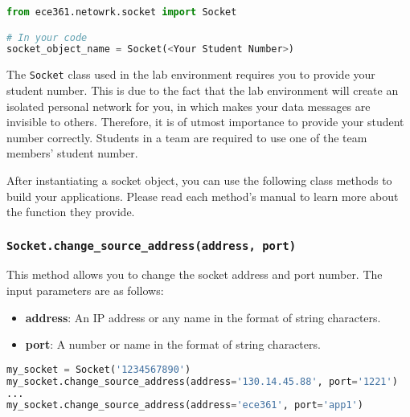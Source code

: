 \documentclass[11pt]{article}
\begin{document}
\begin{lstlisting}[caption={Importing the \texttt{Socket} class}, language=Python]
from ece361.netowrk.socket import Socket

# In your code
socket_object_name = Socket(<Your Student Number>)
\end{lstlisting}

The \texttt{Socket} class used in the lab environment requires you to provide your student number. This is due to the fact that the lab environment will create an isolated personal network for you, in which makes your data messages are invisible to others. Therefore, it is of utmost importance to provide your student number correctly. Students in a team are required to use one of the team members' student number.

After instantiating a socket object, you can use the following class methods to build your applications. Please read each method's manual to learn more about the function they provide.

\subsubsection{\texttt{Socket.change\_source\_address(address, port)}}
This method allows you to change the socket address and port number. The input parameters are as follows:
\begin{itemize}
    \item \textbf{address}: An IP address or any name in the format of string characters.
    \item \textbf{port}: A number or name in the format of string characters.
\end{itemize}

\begin{lstlisting}[caption={Example for using \texttt{change\_source\_address()}}, language=Python]
my_socket = Socket('1234567890')
my_socket.change_source_address(address='130.14.45.88', port='1221')
...
my_socket.change_source_address(address='ece361', port='app1')
\end{lstlisting}
\end{document}
